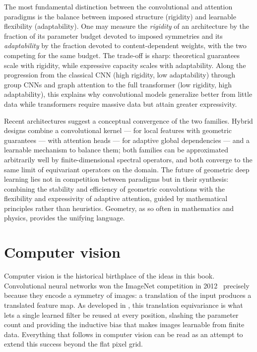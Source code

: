 \begin{remark}
\label{rem:apps:rigidity-adaptability}
The most fundamental distinction between the convolutional and attention
paradigms is the balance between imposed structure (rigidity) and learnable
flexibility (adaptability). One may measure the \emph{rigidity} of an
architecture by the fraction of its parameter budget devoted to imposed
symmetries and its \emph{adaptability} by the fraction devoted to
content-dependent weights, with the two competing for the same budget. The
trade-off is sharp: theoretical guarantees scale with rigidity, while expressive
capacity scales with adaptability. Along the progression from the classical CNN
(high rigidity, low adaptability) through group CNNs and graph attention to the
full transformer (low rigidity, high adaptability), this explains why
convolutional models generalize better from little data while transformers
require massive data but attain greater expressivity.
\end{remark}

\begin{remark}
\label{rem:apps:convergence}
Recent architectures suggest a conceptual convergence of the two families.
Hybrid designs combine a convolutional kernel --- for local features with
geometric guarantees --- with attention heads --- for adaptive global
dependencies --- and a learnable mechanism to balance them; both families can be
approximated arbitrarily well by finite-dimensional spectral operators, and both
converge to the same limit of equivariant operators on the domain. The future of
geometric deep learning lies not in competition between paradigms but in their
synthesis: combining the stability and efficiency of geometric convolutions with
the flexibility and expressivity of adaptive attention, guided by mathematical
principles rather than heuristics. Geometry, as so often in mathematics and
physics, provides the unifying language.
\end{remark}

\section{Computer vision}
\label{sec:apps:vision}

Computer vision is the historical birthplace of the ideas in this book.
Convolutional neural networks won the ImageNet competition in
2012~\citep{krizhevsky2012alexnet} precisely because they encode a symmetry of
images: a translation of the input produces a translated feature map. As
developed in , this translation equivariance is what lets a
single learned filter be reused at every position, slashing the parameter count
and providing the inductive bias that makes images learnable from finite data.
Everything that follows in computer vision can be read as an attempt to extend
this success beyond the flat pixel grid.

